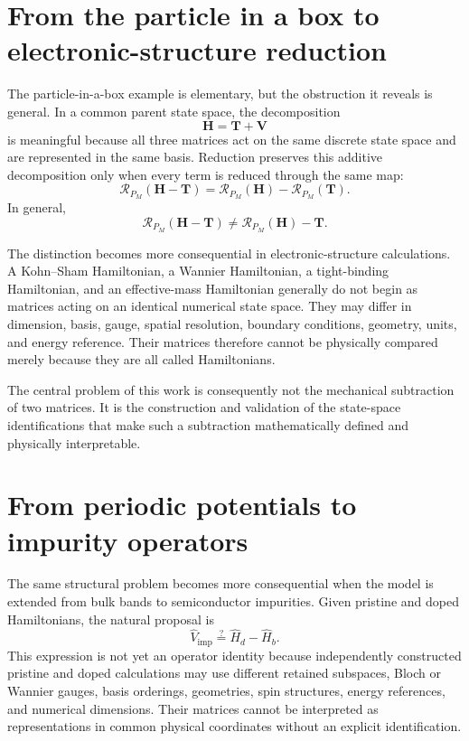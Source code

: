 \section{From the particle in a box to electronic-structure reduction}

The particle-in-a-box example is elementary, but the obstruction it reveals is
general. In a common parent state space, the decomposition
\begin{equation}
    \mathbf H=\mathbf T+\mathbf V
\end{equation}
is meaningful because all three matrices act on the same discrete state space
and are represented in the same basis. Reduction preserves this additive
decomposition only when every term is reduced through the same map:
\begin{equation}
    \mathcal R_{P_M}(\mathbf H-\mathbf T)
    =
    \mathcal R_{P_M}(\mathbf H)
    -
    \mathcal R_{P_M}(\mathbf T).
\end{equation}
In general,
\begin{equation}
    \mathcal R_{P_M}(\mathbf H-\mathbf T)
    \neq
    \mathcal R_{P_M}(\mathbf H)-\mathbf T.
\end{equation}

The distinction becomes more consequential in electronic-structure
calculations. A Kohn--Sham Hamiltonian, a Wannier Hamiltonian, a tight-binding
Hamiltonian, and an effective-mass Hamiltonian generally do not begin as
matrices acting on an identical numerical state space. They may differ in
dimension, basis, gauge, spatial resolution, boundary conditions, geometry,
units, and energy reference. Their matrices therefore cannot be physically
compared merely because they are all called Hamiltonians.

The central problem of this work is consequently not the mechanical
subtraction of two matrices. It is the construction and validation of the
state-space identifications that make such a subtraction mathematically
defined and physically interpretable.

\section{From periodic potentials to impurity operators}


The same structural problem becomes more consequential when the model is
extended from bulk bands to semiconductor impurities. Given pristine and doped
Hamiltonians, the natural proposal is
\begin{equation}
    \hat V_{\mathrm{imp}}
    \stackrel{?}{=}
    \hat H_d-\hat H_b.
\end{equation}
This expression is not yet an operator identity because independently
constructed pristine and doped calculations may use different retained
subspaces, Bloch or Wannier gauges, basis orderings, geometries, spin
structures, energy references, and numerical dimensions. Their matrices cannot
be interpreted as representations in common physical coordinates without an
explicit identification.

